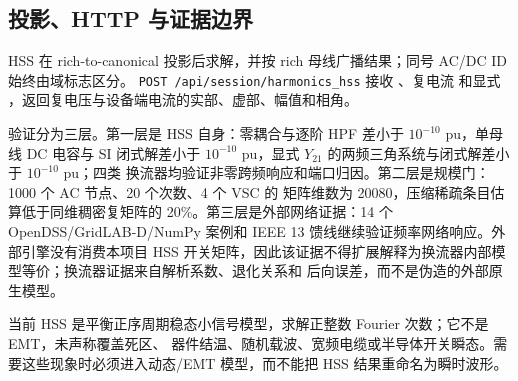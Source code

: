 \subsection{投影、HTTP 与证据边界}
HSS 在 rich-to-canonical 投影后求解，并按 rich 母线广播结果；同号 AC/DC ID 始终由域标志区分。
\texttt{POST /api/session/harmonics\_hss} 接收 、复电流  和显式
，返回复电压与设备端电流的实部、虚部、幅值和相角。

验证分为三层。第一层是 HSS 自身：零耦合与逐阶 HPF 差小于 $10^{-10}$ pu，单母线 DC 电容与
SI 闭式解差小于 $10^{-10}$ pu，显式 $Y_{21}$ 的两频三角系统与闭式解差小于 $10^{-10}$ pu；四类
换流器均验证非零跨频响应和端口归因。第二层是规模门：1000 个 AC 节点、20 个次数、4 个 VSC 的
矩阵维数为 20080，压缩稀疏条目估算低于同维稠密复矩阵的 20\%。第三层是外部网络证据：14 个
OpenDSS/GridLAB-D/NumPy 案例和 IEEE 13 馈线继续验证频率网络响应。外部引擎没有消费本项目 HSS
开关矩阵，因此该证据不得扩展解释为换流器内部模型等价；换流器证据来自解析系数、退化关系和
后向误差，而不是伪造的外部原生模型。

当前 HSS 是平衡正序周期稳态小信号模型，求解正整数 Fourier 次数；它不是 EMT，未声称覆盖死区、
器件结温、随机载波、宽频电缆或半导体开关瞬态。需要这些现象时必须进入动态/EMT 模型，而不能把
HSS 结果重命名为瞬时波形。
